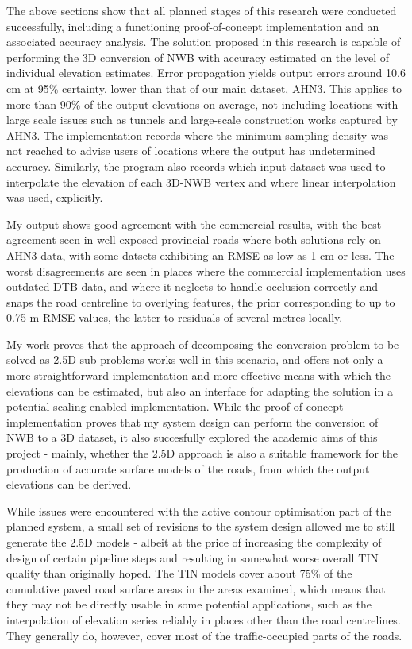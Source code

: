 The above sections show that all planned stages of this research were conducted successfully, including a functioning proof-of-concept implementation and an associated accuracy analysis. The solution proposed in this research is capable of performing the 3D conversion of NWB with accuracy estimated on the level of individual elevation estimates. Error propagation yields output errors around 10.6 cm at 95\% certainty, lower than that of our main dataset, AHN3. This applies to more than 90\% of the output elevations on average, not including locations with large scale issues such as tunnels and large-scale construction works captured by AHN3. The implementation records where the minimum sampling density was not reached to advise users of locations where the output has undetermined accuracy. Similarly, the program also records which input dataset was used to interpolate the elevation of each 3D-NWB vertex and where linear interpolation was used, explicitly.

My output shows good agreement with the commercial results, with the best agreement seen in well-exposed provincial roads where both solutions rely on AHN3 data, with some datsets exhibiting an RMSE as low as 1 cm or less. The worst disagreements are seen in places where the commercial implementation uses outdated DTB data, and where it neglects to handle occlusion correctly and snaps the road centreline to overlying features, the prior corresponding to up to 0.75 m RMSE values, the latter to residuals of several metres locally.

My work proves that the approach of decomposing the conversion problem to be solved as 2.5D sub-problems works well in this scenario, and offers not only a more straightforward implementation and more effective means with which the elevations can be estimated, but also an interface for adapting the solution in a potential scaling-enabled implementation. While the proof-of-concept implementation proves that my system design can perform the conversion of NWB to a 3D dataset, it also succesfully explored the academic aims of this project - mainly, whether the 2.5D approach is also a suitable framework for the production of accurate surface models of the roads, from which the output elevations can be derived.

While issues were encountered with the active contour optimisation part of the planned system, a small set of revisions to the system design allowed me to still generate the 2.5D models - albeit at the price of increasing the complexity of design of certain pipeline steps and resulting in somewhat worse overall TIN quality than originally hoped. The TIN models cover about 75\% of the cumulative paved road surface areas in the areas examined, which means that they may not be directly usable in some potential applications, such as the interpolation of elevation series reliably in places other than the road centrelines. They generally do, however, cover most of the traffic-occupied parts of the roads.

